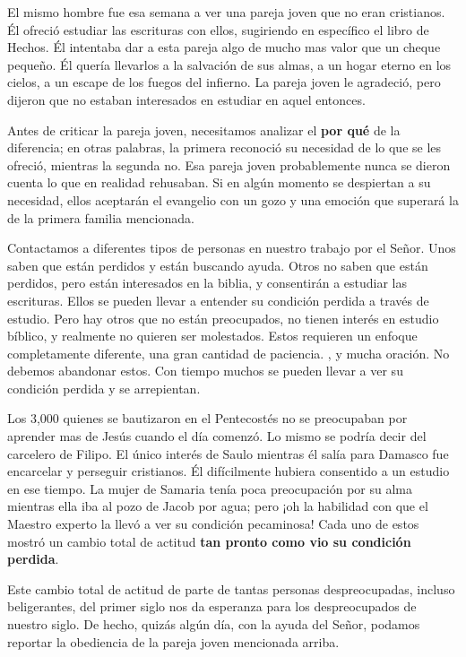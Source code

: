 \documentclass[12pt, twoside, openright]{book}
\begin{document}
El mismo hombre fue esa semana a ver una pareja joven que no eran cristianos. Él ofreció estudiar las escrituras con ellos, sugiriendo en específico el libro de Hechos. Él intentaba dar a esta pareja algo de mucho mas valor que un cheque pequeño. Él quería llevarlos a la salvación de sus almas, a un hogar eterno en los cielos, a un escape de los fuegos del infierno. La pareja joven le agradeció, pero dijeron que no estaban interesados en estudiar en aquel entonces.

Antes de criticar la pareja joven, necesitamos analizar el \textbf{por qué} de la diferencia; en otras palabras, la primera reconoció su necesidad de lo que se les ofreció, mientras la segunda no. Esa pareja joven probablemente nunca se dieron cuenta lo que en realidad rehusaban. Si en algún momento se despiertan a su necesidad, ellos aceptarán el evangelio con un gozo y una emoción que superará la de la primera familia mencionada.

Contactamos a diferentes tipos de personas en nuestro trabajo por el Señor. Unos saben que están perdidos y están buscando ayuda. Otros no saben que están perdidos, pero están interesados en la biblia, y consentirán a estudiar las escrituras. Ellos se pueden llevar a entender su condición perdida a través de estudio. Pero hay otros que no están preocupados, no tienen interés en estudio bíblico, y realmente no quieren ser molestados. Estos requieren un enfoque completamente diferente, una gran cantidad de paciencia. , y mucha oración. No debemos abandonar estos. Con tiempo muchos se pueden llevar a ver su condición perdida y se arrepientan.

Los 3,000 quienes se bautizaron en el Pentecostés no se preocupaban por aprender mas de Jesús cuando el día comenzó. Lo mismo se podría decir del carcelero de Filipo. El único interés de Saulo mientras él salía para Damasco fue encarcelar y perseguir cristianos. Él difícilmente hubiera consentido a un estudio en ese tiempo. La mujer de Samaria tenía poca preocupación por su alma mientras ella iba al pozo de Jacob por agua; pero ¡oh la habilidad con que el Maestro experto la llevó a ver su condición pecaminosa! Cada uno de estos mostró un cambio total de actitud \textbf{tan pronto como vio su condición perdida}. 

Este cambio total de actitud de parte de tantas personas despreocupadas, incluso beligerantes, del primer siglo nos da esperanza para los despreocupados de nuestro siglo. De hecho, quizás algún día, con la ayuda del Señor, podamos reportar la obediencia de la pareja joven mencionada arriba.
\end{document}
